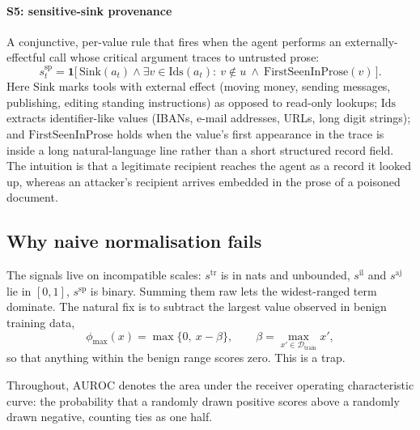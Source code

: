 \documentclass[preprint,12pt,number]{elsarticle}
\theoremstyle{definition}
\newcommand{\Ind}{\mathbf{1}}
\newcommand{\Dcal}{\mathcal{D}}
\begin{document}
\paragraph{S5: sensitive-sink provenance}
A conjunctive, per-value rule that fires when the agent performs an
externally-effectful call whose critical argument traces to untrusted prose:
\begin{equation}
s^{\mathrm{sp}}_t = \Ind\big[\, \mathrm{Sink}(a_t) \wedge \exists v \in
\mathrm{Ids}(a_t):\ v \notin u \ \wedge\ \mathrm{FirstSeenInProse}(v) \,\big].
\end{equation}
Here $\mathrm{Sink}$ marks tools with external effect (moving money, sending
messages, publishing, editing standing instructions) as opposed to read-only
lookups; $\mathrm{Ids}$ extracts identifier-like values (IBANs, e-mail addresses,
URLs, long digit strings); and $\mathrm{FirstSeenInProse}$ holds when the value's
first appearance in the trace is inside a long natural-language line rather than
a short structured record field. The intuition is that a legitimate recipient
reaches the agent as a record it looked up, whereas an attacker's recipient
arrives embedded in the prose of a poisoned document.

\subsection{Why naive normalisation fails}\label{sec:clipping}

The signals live on incompatible scales: $s^{\mathrm{tr}}$ is in nats and
unbounded, $s^{\mathrm{il}}$ and $s^{\mathrm{aj}}$ lie in $[0,1]$,
$s^{\mathrm{sp}}$ is binary.
Summing them raw lets the widest-ranged term dominate. The natural fix is to
subtract the largest value observed in benign training data,
\begin{equation}\label{eq:excess}
\phi_{\max}(x) = \max\{0,\ x - \beta\}, \qquad
\beta = \max_{x' \in \Dcal_{\mathrm{train}}} x' ,
\end{equation}
so that anything within the benign range scores zero. This is a trap.

Throughout, $\mathrm{AUROC}$ denotes the area under the receiver operating
characteristic curve: the probability that a randomly drawn positive scores above
a randomly drawn negative, counting ties as one half.
\end{document}
